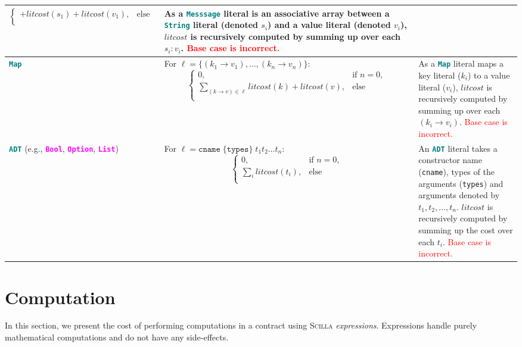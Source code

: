 \documentclass[9pt]{article}
\begin{document}
\begin{table}[!hbt]
\begin{tabular}{|p{3cm}|p{6.7cm}|p{6cm}|}
$$\begin{cases}
    		 + litcost(s_1) + litcost(v_1), & 
    		\text{else } \\
  \end{cases}
		$$ & As a \textbf{\texttt{\textcolor{teal}{Messsage}}} literal is an associative array
		between a  \textbf{\texttt{\textcolor{teal}{String}}} literal (denoted $s_i$) and a
		value literal (denoted $v_i$), $litcost$
		is recursively computed by summing up over each $s_i : v_i$.
		\textcolor{red}{Base case is incorrect.}   \\ \hline
		\textbf{\texttt{\textcolor{teal}{Map}}} &
		For $\ell = \{(k_1 \rightarrow v_1), 
		\ldots, (k_n \rightarrow v_n)\}$:
		$$ \begin{cases}
    		0, & \text{if } n = 0,  \\
  			\sum_{(k \rightarrow v) \in \ell} {litcost(k) + litcost(v)},  &
    		\text{else } \\
  \end{cases}
		$$ & As a \textbf{\texttt{\textcolor{teal}{Map}}} literal maps a key literal ($k_i$) to a
		value literal ($v_i$),  $litcost$
		is recursively computed by summing up over each $(k_i \rightarrow v_i)$. \textcolor{red}{Base case is incorrect.} \\ \hline
		\textbf{\texttt{\textcolor{teal}{ADT}}} (e.g.,
		\textbf{\textcolor{magenta}{\texttt{Bool}}},
		\textbf{\textcolor{magenta}{\texttt{Option}}},
		\textbf{\textcolor{magenta}{\texttt{List}}}) & For $\ell = \texttt{cname}\;
		\{\texttt{types}\} \; t_1 t_2 \ldots t_n $:
		$$ \begin{cases}
    		0, & \text{if } n = 0,  \\
  			\sum_{i} {litcost(t_i)},  &
    		\text{else } \\
  		\end{cases}
		$$ 
		
		& An \textbf{\texttt{\textcolor{teal}{ADT}}} literal takes a constructor name
		(\texttt{cname}), types of the arguments (\texttt{types}) and arguments
		denoted by $t_1, t_2, \ldots, t_n$. $litcost$ is recursively computed
		by summing up the cost over each $t_i$. \textcolor{red}{Base case is incorrect.} \\ \hline
	\end{tabular}
	\end{table}
 
\section{Computation}

In this section, we present the cost of performing computations in a contract
using \textsc{Scilla} \emph{expressions}. Expressions handle purely
mathematical computations and do not have any side-effects. 
\end{document}
